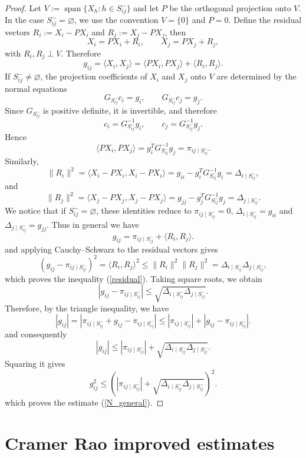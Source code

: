 \documentclass[10pt,a4paper]{amsart}
\begin{document}
\begin{proof}
Let $V:=\operatorname{span}\{X_h:h\in S^{-}_{ij}\}$ and let $P$ be the orthogonal projection onto $V$. In the case $S^{-}_{ij}=\varnothing$, we use the convention $V=\{0\}$ and $P=0$. Define the residual vectors $R_i:=X_i-PX_i$ and $R_j:=X_j-PX_j$, then
$$
X_i=PX_i+R_i,
\qquad
X_j=PX_j+R_j,
$$
with $R_i,R_j\perp V$. Therefore
$$
g_{ij}
=
\langle X_i,X_j\rangle
=
\langle PX_i,PX_j\rangle
+
\langle R_i,R_j\rangle .
$$
If $S^{-}_{ij}\neq\varnothing$, the projection coefficients of $X_i$ and $X_j$ onto $V$ are determined by the normal equations
$$
G_{S^{-}_{ij}}c_i=g_i,
\qquad
G_{S^{-}_{ij}}c_j=g_j.
$$
Since $G_{S^{-}_{ij}}$ is positive definite, it is invertible, and therefore
$$
c_i=G_{S^{-}_{ij}}^{-1}g_i,
\qquad
c_j=G_{S^{-}_{ij}}^{-1}g_j.
$$
Hence
$$
\langle PX_i,PX_j\rangle
=
g_i^TG_{S^{-}_{ij}}^{-1}g_j
=
\pi_{ij\mid S^{-}_{ij}}.
$$
Similarly,
$$
\|R_i\|^2
=
\langle X_i-PX_i,X_i-PX_i\rangle
=
g_{ii}-g_i^TG_{S^{-}_{ij}}^{-1}g_i
=
\Delta_{i\mid S^{-}_{ij}},
$$
and
$$
\|R_j\|^2
=
\langle X_j-PX_j,X_j-PX_j\rangle
=
g_{jj}-g_j^TG_{S^{-}_{ij}}^{-1}g_j
=
\Delta_{j\mid S^{-}_{ij}}.
$$
We notice that if $S^{-}_{ij}=\varnothing$, these identities reduce to $\pi_{ij\mid S^{-}_{ij}}=0$, $\Delta_{i\mid S^{-}_{ij}}=g_{ii}$ and $\Delta_{j\mid S^{-}_{ij}}=g_{jj}$.
Thus in general we have
$$
g_{ij}
=
\pi_{ij\mid S^{-}_{ij}}
+
\langle R_i,R_j\rangle .
$$
and applying Cauchy--Schwarz to the residual vectors gives
$$
\left(
g_{ij}-\pi_{ij\mid S^{-}_{ij}}
\right)^2
=
\langle R_i,R_j\rangle^2
\leq
\|R_i\|^2\|R_j\|^2
=
\Delta_{i\mid S^{-}_{ij}}\Delta_{j\mid S^{-}_{ij}},
$$
which proves the inequality (\ref{residual}). Taking square roots, we obtain
$$
|g_{ij}-\pi_{ij\mid S^{-}_{ij}}|
\leq
\sqrt{
\Delta_{i\mid S^{-}_{ij}}\Delta_{j\mid S^{-}_{ij}}
}.
$$
Therefore, by the triangle inequality, we have
$$
|g_{ij}|
=
\left|
\pi_{ij\mid S^{-}_{ij}}
+
g_{ij}-\pi_{ij\mid S^{-}_{ij}}
\right|
\leq
|\pi_{ij\mid S^{-}_{ij}}|
+
|g_{ij}-\pi_{ij\mid S^{-}_{ij}}|.
$$
and consequently
$$
|g_{ij}|
\leq
|\pi_{ij\mid S^{-}_{ij}}|
+
\sqrt{
\Delta_{i\mid S^{-}_{ij}}\Delta_{j\mid S^{-}_{ij}}
}.
$$
Squaring it gives
$$
g_{ij}^2
\leq
\left(
|\pi_{ij\mid S^{-}_{ij}}|
+
\sqrt{
\Delta_{i\mid S^{-}_{ij}}\Delta_{j\mid S^{-}_{ij}}
}
\right)^2.
$$
which proves the  estimate (\ref{N_general}).
\end{proof}

\section{Cramer Rao improved estimates}
\end{document}
